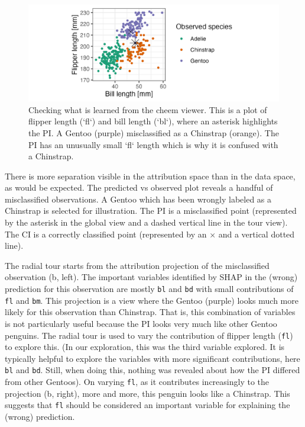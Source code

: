 \documentclass[
]{article}
\begin{document}
\begin{figure}

{\centering \includegraphics[width=1\linewidth]{./figures/case_penguins_BlFl} 

}

\caption{Checking what is learned from the cheem viewer. This is a plot of flipper length (`fl`) and bill length (`bl`), where an asterisk highlights the PI. A Gentoo (purple) misclassified as a Chinstrap (orange). The PI has an unusually small `fl` length which is why it is confused with a Chinstrap.}\label{fig:casepenguinsblfl}
\end{figure}

There is more separation visible in the attribution space than in the data space, as would be expected. The predicted vs observed plot reveals a handful of misclassified observations. A Gentoo which has been wrongly labeled as a Chinstrap is selected for illustration. The PI is a misclassified point (represented by the asterisk in the global view and a dashed vertical line in the tour view). The CI is a correctly classified point (represented by an \(\times\) and a vertical dotted line).

The radial tour starts from the attribution projection of the misclassified observation (b, left). The important variables identified by SHAP in the (wrong) prediction for this observation are mostly \texttt{bl} and \texttt{bd} with small contributions of \texttt{fl} and \texttt{bm}. This projection is a view where the Gentoo (purple) looks much more likely for this observation than Chinstrap. That is, this combination of variables is not particularly useful because the PI looks very much like other Gentoo penguins. The radial tour is used to vary the contribution of flipper length (\texttt{fl}) to explore this. (In our exploration, this was the third variable explored. It is typically helpful to explore the variables with more significant contributions, here \texttt{bl} and \texttt{bd}. Still, when doing this, nothing was revealed about how the PI differed from other Gentoos). On varying \texttt{fl}, as it contributes increasingly to the projection (b, right), more and more, this penguin looks like a Chinstrap. This suggests that \texttt{fl} should be considered an important variable for explaining the (wrong) prediction.
\end{document}
